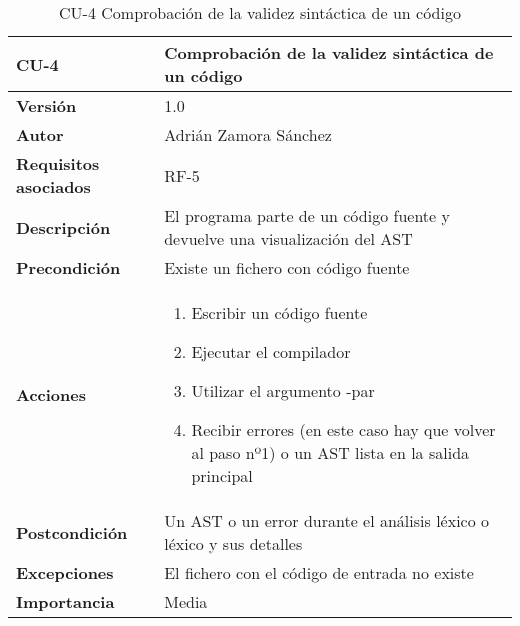\begin{table}[p]
	\centering
	\begin{tabularx}{\linewidth}{ p{} p{} }
		\toprule
		\textbf{CU-4}    & \textbf{Comprobación de la validez sintáctica de un código}\\
		\toprule
		\textbf{Versión}              & 1.0    \\
		\textbf{Autor}                & Adrián Zamora Sánchez \\
		\textbf{Requisitos asociados} & RF-5\\
		\textbf{Descripción}          & El programa parte de un código fuente y devuelve una visualización del AST \\
		\textbf{Precondición}         & Existe un fichero con código fuente \\
		\textbf{Acciones}             &
		\begin{enumerate}
			\def\labelenumi{\arabic{enumi}.}
			\tightlist
			\item Escribir un código fuente
			\item Ejecutar el compilador
			\item Utilizar el argumento -par
			\item Recibir errores (en este caso hay que volver al paso nº1) o un AST lista en la salida principal
		\end{enumerate}\\
		\textbf{Postcondición}        & Un AST o un error durante el análisis léxico o léxico y sus detalles \\
		\textbf{Excepciones}          & El fichero con el código de entrada no existe \\
		\textbf{Importancia}          & Media \\ 
		\bottomrule
	\end{tabularx}
	\caption{CU-4 Comprobación de la validez sintáctica de un código}
\end{table}

